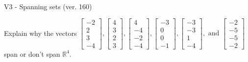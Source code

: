 \begin{exercise}
  \begin{exerciseTitle}V3 - Spanning sets (ver. 160)\end{exerciseTitle}
  \begin{exerciseStatement}
    Explain why the vectors \(\left[\begin{array}{r}
-2 \\
2 \\
3 \\
-4
\end{array}\right] , \left[\begin{array}{r}
4 \\
3 \\
2 \\
3
\end{array}\right] , \left[\begin{array}{r}
4 \\
-4 \\
-2 \\
-4
\end{array}\right] , \left[\begin{array}{r}
-3 \\
0 \\
0 \\
-1
\end{array}\right] , \left[\begin{array}{r}
-3 \\
-3 \\
1 \\
-4
\end{array}\right] , \text{ and } \left[\begin{array}{r}
-2 \\
-5 \\
-5 \\
-2
\end{array}\right]\) span or don't span \(\mathbb{R}^4\). 
	



\end{exerciseStatement}
\end{exercise}
